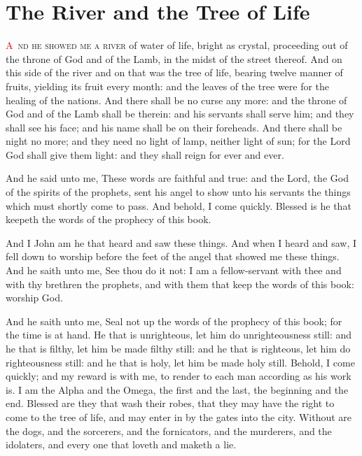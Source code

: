 
\chapter{The River and the Tree of Life}
\lettrine[lines=3,slope=-0.5em]{\textcolor{red}{A}}{\ nd he showed me a river} of water of life, bright as crystal, proceeding out of the throne of God and of the Lamb, 
 in the midst of the street thereof. And on this side of the river and on that was the tree of life, bearing twelve manner of fruits, yielding its fruit every month: and the leaves of the tree were for the healing of the nations. 
 And there shall be no curse any more: and the throne of God and of the Lamb shall be therein: and his servants shall serve him; 
 and they shall see his face; and his name shall be on their foreheads. 
 And there shall be night no more; and they need no light of lamp, neither light of sun; for the Lord God shall give them light: and they shall reign for ever and ever.

 And he said unto me, These words are faithful and true: and the Lord, the God of the spirits of the prophets, sent his angel to show unto his servants the things which must shortly come to pass. 
 And behold, I come quickly. Blessed is he that keepeth the words of the prophecy of this book.

 And I John am he that heard and saw these things. And when I heard and saw, I fell down to worship before the feet of the angel that showed me these things. 
 And he saith unto me, See thou do it not: I am a fellow-servant with thee and with thy brethren the prophets, and with them that keep the words of this book: worship God.

 And he saith unto me, Seal not up the words of the prophecy of this book; for the time is at hand. 
 He that is unrighteous, let him do unrighteousness still: and he that is filthy, let him be made filthy still: and he that is righteous, let him do righteousness still: and he that is holy, let him be made holy still. 
 Behold, I come quickly; and my reward is with me, to render to each man according as his work is. 
 I am the Alpha and the Omega, the first and the last, the beginning and the end. 
 Blessed are they that wash their robes, that they may have the right to come to the tree of life, and may enter in by the gates into the city. 
 Without are the dogs, and the sorcerers, and the fornicators, and the murderers, and the idolaters, and every one that loveth and maketh a lie.

